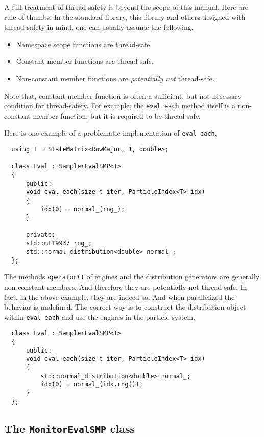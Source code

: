 A full treatment of thread-safety is beyond the scope of this manual. Here are
rule of thumbs. In the standard library, this library and others designed with
thread-safety in mind, one can usually assume the following,
\begin{itemize}
  \item Namespace scope functions are thread-safe.
  \item Constant member functions are thread-safe.
  \item Non-constant member functions are \emph{potentially not} thread-safe.
\end{itemize}
Note that, constant member function is often a sufficient, but not necessary
condition for thread-safety. For example, the \verb|eval_each| method itself is
a non-constant member function, but it is required to be thread-safe.

Here is one example of a problematic implementation of \verb|eval_each|,
\begin{Verbatim}
  using T = StateMatrix<RowMajor, 1, double>;

  class Eval : SamplerEvalSMP<T>
  {
      public:
      void eval_each(size_t iter, ParticleIndex<T> idx)
      {
          idx(0) = normal_(rng_);
      }

      private:
      std::mt19937 rng_;
      std::normal_distribution<double> normal_;
  };
\end{Verbatim}
The methods \verb|operator()| of \rng engines and the distribution generators
are generally non-constant members. And therefore they are potentially not
thread-safe. In fact, in the above example, they are indeed so. And when
parallelized the behavior is undefined. The correct way is to construct the
distribution object within \verb|eval_each| and use the \rng engines in the
particle system,
\begin{Verbatim}
  class Eval : SamplerEvalSMP<T>
  {
      public:
      void eval_each(size_t iter, ParticleIndex<T> idx)
      {
          std::normal_distribution<double> normal_;
          idx(0) = normal_(idx.rng());
      }
  };
\end{Verbatim}

\subsection{The \texorpdfstring{\texttt{MonitorEvalSMP}}{MonitorEvalSMP} class}
\label{sub:he MonitorEvalSMP class}

